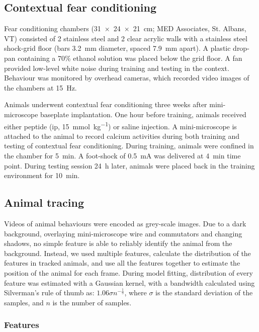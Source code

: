 \subsection{Contextual fear conditioning}
Fear conditioning chambers (\SI{31 x 24 x 21}{\cm}; MED Associates, St. Albans, VT) consisted of 2 stainless steel and 2 clear acrylic walls with a stainless steel shock-grid floor (bars \SI{3.2}{\mm} diameter, spaced \SI{7.9}{\mm} apart). A plastic drop-pan containing a 70\% ethanol solution was placed below the grid floor. A fan provided low-level white noise during training and testing in the context. Behaviour was monitored by overhead cameras, which recorded video images of the chambers at \SI{15}{\Hz}. 

Animals underwent contextual fear conditioning three weeks after mini-microscope baseplate implantation. One hour before training, animals received either \tglu peptide (\gls{ip}, \SI{15}{\mmol\per\kg}) or saline injection. A mini-microscope is attached to the animal to record calcium activities during both training and testing of contextual fear conditioning. During training, animals were confined in the chamber for \SI{5}{\minute}. A foot-shock of \SI{0.5}{\mA} was delivered at \SI{4}{\minute} time point. During testing session \SI{24}{\hour} later, animals were placed back in the training environment for \SI{10}{\minute}. 

\subsection{Animal tracing}
Videos of animal behaviours were encoded as grey-scale images. Due to a dark background, overlaying mini-microscope wire and commutators and changing shadows, no simple feature is able to reliably identify the animal from the background. Instead, we used multiple features, calculate the distribution of the features in tracked animals, and use all the features together to estimate the position of the animal for each frame. During model fitting, distribution of every feature was estimated with a Gaussian kernel, with a bandwidth calculated using Silverman's rule of thumb as: $1.06\sigma n^{-\frac{1}{5}}$, where $\sigma$ is the standard deviation of the samples, and $n$ is the number of samples.

\subsubsection{Features}

